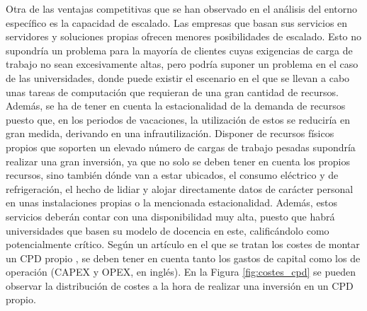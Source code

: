 Otra de las ventajas competitivas que se han observado en el análisis del entorno específico es la capacidad de escalado. Las empresas que basan sus servicios en servidores y soluciones propias ofrecen menores posibilidades de escalado. Esto no supondría un problema para la mayoría de clientes cuyas exigencias de carga de trabajo no sean excesivamente altas, pero podría suponer un problema en el caso de las universidades, donde puede existir el escenario en el que se llevan a cabo unas tareas de computación que requieran de una gran cantidad de recursos. Además, se ha de tener en cuenta la estacionalidad de la demanda de recursos puesto que, en los periodos de vacaciones, la utilización de estos se reduciría en gran medida, derivando en una infrautilización. Disponer de recursos físicos propios que soporten un elevado número de cargas de trabajo pesadas supondría realizar una gran inversión, ya que no solo se deben tener en cuenta los propios recursos, sino también dónde van a estar ubicados, el consumo eléctrico y de refrigeración, el hecho de lidiar y alojar directamente datos de carácter personal en unas instalaciones propias o la mencionada estacionalidad. Además, estos servicios deberán contar con una disponibilidad muy alta, puesto que habrá universidades que basen su modelo de docencia en este, calificándolo como potencialmente crítico. Según un artículo en el que se tratan los costes de montar un \acs{CPD} propio \cite{cristinalopezalbarran}, se deben tener en cuenta tanto los gastos de capital como los de operación (\acf{CAPEX} y \acf{OPEX}, en inglés). En la Figura \ref{fig:costes_cpd} se pueden observar la distribución de costes a la hora de realizar una inversión en un \acs{CPD} propio.

\clearpage


